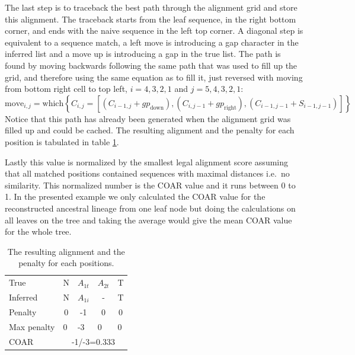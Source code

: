 The last step is to traceback the best path through the alignment grid and store this alignment.
The traceback starts from the leaf sequence, in the right bottom corner, and ends with the naive sequence in the left top corner.
A diagonal step is equivalent to a sequence match, a left move is introducing a gap character in the inferred list and a move up is introducing a gap in the true list.
The path is found by moving backwards following the same path that was used to fill up the grid, and therefore using the same equation as to fill it, just reversed with moving from bottom right cell to top left, $i=4,3,2,1$ and $j=5,4,3,2,1$:
$$
\text{move}_{i,j} = \text{which}\left\{ C_{i,j} = [(C_{i-1,j} + gp_{\text{down}}), (C_{i,j-1} + gp_{\text{right}}), (C_{i-1,j-1 } + S_{i-1,j-1})] \right\}
$$
Notice that this path has already been generated when the alignment grid was filled up and could be cached. The resulting alignment and the penalty for each position is tabulated in table \ref{NW_final_alignment}.

Lastly this value is normalized by the smallest legal alignment score assuming that all matched positions contained sequences with maximal distances i.e.\ no similarity.
This normalized number is the COAR value and it runs between 0 to 1.
In the presented example we only calculated the COAR value for the reconstructed ancestral lineage from one leaf node but doing the calculations on all leaves on the tree and taking the average would give the mean COAR value for the whole tree.
\begin{table}[ht!]
\centering
\begin{tabular}{|lcccc|}
\hline
\multicolumn{1}{|l|}{True}     & \multicolumn{1}{c|}{N} & \multicolumn{1}{c|}{$A_{1t}$} & \multicolumn{1}{c|}{$A_{2t}$} & T                      \\
\multicolumn{1}{|l|}{Inferred} & \multicolumn{1}{c|}{N} & \multicolumn{1}{c|}{$A_{1i}$} & \multicolumn{1}{c|}{-}        & T                      \\ \hline
Penalty                        & 0                      & -1                             & 0                           & 0                      \\ \hline
Max penalty                    & \multicolumn{1}{l}{0}  & \multicolumn{1}{l}{-3}        & \multicolumn{1}{l}{0}       & \multicolumn{1}{l|}{0} \\ \hline
COAR                           & \multicolumn{4}{c|}{-1/-3=0.333}                                                                                    \\ \hline
\end{tabular}
    \caption{
         \label{NW_final_alignment}
             The resulting alignment and the penalty for each positions.
             }
\end{table}





